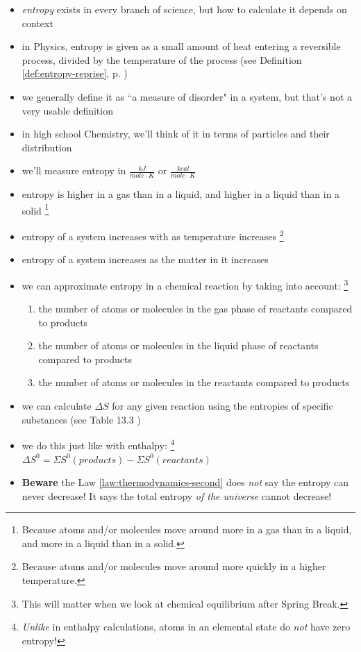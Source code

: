 \documentclass[11pt, oneside]{article}   	%
\begin{document}
\begin{itemize}
\item \emph{entropy} exists in every branch of science, but how to calculate it depends on context
\item in Physics, entropy is given as a small amount of heat entering a reversible process, divided by the temperature of the process (see Definition \ref{def:entropy-reprise}, p. \pageref{def:entropy-reprise})
\item we generally define it as ``a measure of disorder" in a system, but that's not a very usable definition
\item in high school Chemistry, we'll think of it in terms of particles and their distribution
\item we'll measure entropy in $\frac{kJ}{mole \cdot K}$ or $\frac{kcal}{mole \cdot K}$
\item entropy is higher in a gas than in a liquid, and higher in a liquid than in a solid
\footnote{Because atoms and/or molecules move around more in a gas than in a liquid, and more in a liquid than in a solid.}
\item entropy of a system increases with as temperature increases
\footnote{Because atoms and/or molecules move around more quickly in a higher temperature.}
\item entropy of a system increases as the matter in it increases
\item we can approximate entropy in a chemical reaction by taking into account:
\footnote{This will matter when we look at chemical equilibrium after Spring Break.}
\begin{enumerate}
\item the number of atoms or molecules in the gas phase of reactants compared to products
\item the number of atoms or molecules in the liquid phase of reactants compared to products
\item the number of atoms or molecules in the reactants compared to products
\end{enumerate}
\item we can calculate $\Delta S$ for any given reaction using the entropies of specific substances (see Table 13.3 \cite[p. 444]{wile-chem-2})
\item we do this just like with enthalpy:
\footnote{\emph{Unlike} in enthalpy calculations, atoms in an elemental state do \emph{not} have zero entropy!}
$\Delta S^{0} = \Sigma  S^{0} (products) -  \Sigma  S^{0} (reactants)$
\item \textbf{Beware} the Law \ref{law:thermodynamics-second} does \emph{not} say the entropy can never decrease! It says the total entropy \emph{of the universe} cannot decrease!
\end{itemize}
\end{document}
